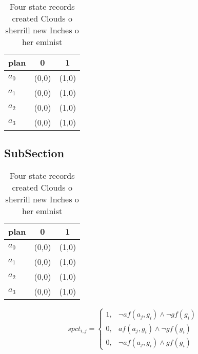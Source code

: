 \documentclass[a4paper]{article}
\begin{document}
\begin{table}
\begin{adjustbox}{width=0.9\columnwidth}
\begin{tabular}{|l|l|l|}
\hline
\textbf{plan} & \multicolumn{1}{c|}{\textbf{0}} & \multicolumn{1}{c|}{\textbf{1}} \\ \hline
\textbf{$a_0$}  & (0,0) & (1,0) \\ \hline
\textbf{$a_1$}  & (0,0) & (1,0) \\ \hline
\textbf{$a_2$}  & (0,0) & (1,0) \\ \hline
\textbf{$a_3$}  & (0,0) & (1,0) \\ \hline
\end{tabular}
\end{adjustbox}
\caption{Four state records created Clouds o sherrill new Inches o her eminist
}
\end{table}

\subsection{SubSection}

\begin{table}
\begin{adjustbox}{width=0.9\columnwidth}
\begin{tabular}{|l|l|l|}
\hline
\textbf{plan} & \multicolumn{1}{c|}{\textbf{0}} & \multicolumn{1}{c|}{\textbf{1}} \\ \hline
\textbf{$a_0$}  & (0,0) & (1,0) \\ \hline
\textbf{$a_1$}  & (0,0) & (1,0) \\ \hline
\textbf{$a_2$}  & (0,0) & (1,0) \\ \hline
\textbf{$a_3$}  & (0,0) & (1,0) \\ \hline
\end{tabular}
\end{adjustbox}
\caption{Four state records created Clouds o sherrill new Inches o her eminist
}
\end{table}

\begin{equation}
spct_{i,j} =
\begin{cases}
1, & \text{$\neg af(a_j,g_i) \wedge \neg gf(g_i)$}\\
0, & \text{$af(a_j,g_i) \wedge \neg gf(g_i)$}\\
0, & \text{$\neg af(a_j,g_i) \wedge gf(g_i)$}
\end{cases}
\end{equation}
\end{document}
